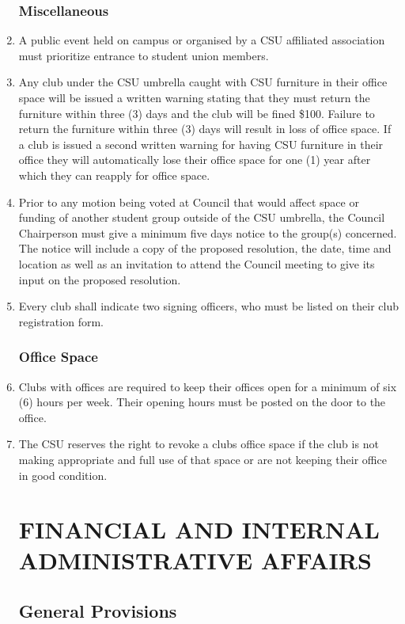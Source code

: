 \documentclass[oneside]{book}
\begin{document}
\begin{enumerate}
\section{\label{Miscellaneous}Miscellaneous }
\item A public event held on campus or organised by a CSU affiliated association
must prioritize entrance to student union members. 
\item Any club under the CSU umbrella caught with CSU furniture in their
office space will be issued a written warning stating that they must
return the furniture within three (3) days and the club will be fined
\$100. Failure to return the furniture within three (3) days will
result in loss of office space. If a club is issued a second written
warning for having CSU furniture in their office they will automatically
lose their office space for one (1) year after which they can reapply
for office space. 
\item Prior to any motion being voted at Council that would affect space
or funding of another student group outside of the CSU umbrella, the
Council Chairperson must give a minimum five days notice to the group(s)
concerned. The notice will include a copy of the proposed resolution,
the date, time and location as well as an invitation to attend the
Council meeting to give its input on the proposed resolution. 
\item Every club shall indicate two signing officers, who must be listed on their club registration form.

\section{\label{Office_Space}Office Space }
\item Clubs with offices are required to keep their offices open for a minimum
of six (6) hours per week. Their opening hours must be posted on the
door to the office. 
\item The CSU reserves the right to revoke a clubs office space if the club
is not making appropriate and full use of that space or are not keeping
their office in good condition. 

\part{\label{FINANCIAL_AND_INTERNAL_ADMINISTRATIVE_AFFAIRS}FINANCIAL AND INTERNAL ADMINISTRATIVE AFFAIRS }
\chapter{\label{Financial_General_Provisions}General Provisions }


\end{enumerate}
\end{document}
